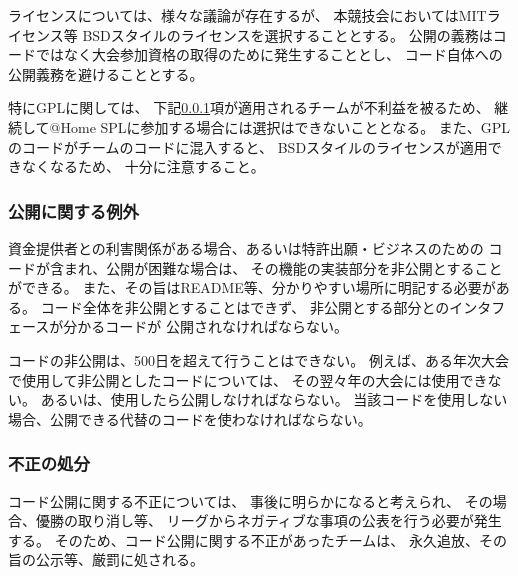 \documentclass[a4j]{jarticle}
\begin{document}
ライセンスについては、様々な議論が存在するが、
本競技会においてはMITライセンス等
BSDスタイルのライセンスを選択することとする。
公開の義務はコードではなく大会参加資格の取得のために発生することとし、
コード自体への公開義務を避けることとする。

特にGPLに関しては、
下記\ref{sub:licence_exception}項が適用されるチームが不利益を被るため、
継続して@Home SPLに参加する場合には選択はできないこととなる。
また、GPLのコードがチームのコードに混入すると、
BSDスタイルのライセンスが適用できなくなるため、
十分に注意すること。

\subsubsection{公開に関する例外}\label{sub:licence_exception}

資金提供者との利害関係がある場合、あるいは特許出願・ビジネスのための
コードが含まれ、公開が困難な場合は、
その機能の実装部分を非公開とすることができる。
また、その旨はREADME等、分かりやすい場所に明記する必要がある。
コード全体を非公開とすることはできず、
非公開とする部分とのインタフェースが分かるコードが
公開されなければならない。


コードの非公開は、500日を超えて行うことはできない。
例えば、ある年次大会で使用して非公開としたコードについては、
その翌々年の大会には使用できない。
あるいは、使用したら公開しなければならない。
当該コードを使用しない場合、公開できる代替のコードを使わなければならない。

\subsubsection{不正の処分}


コード公開に関する不正については、
事後に明らかになると考えられ、
その場合、優勝の取り消し等、
リーグからネガティブな事項の公表を行う必要が発生する。
そのため、コード公開に関する不正があったチームは、
永久追放、その旨の公示等、厳罰に処される。

%
\end{document}
